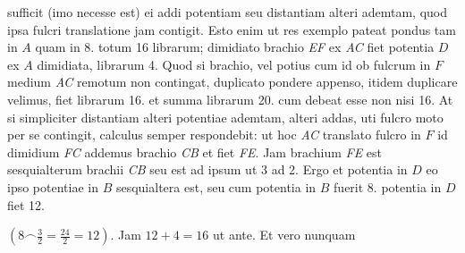 sufficit (imo necesse est) ei addi potentiam\protect{} seu distantiam alteri ademtam,
quod ipsa fulcr\protect{}i translatione jam contigit.
Esto enim ut res exemplo pateat pondus\protect{}
tam in $A$ quam in
8. totum 16 librarum;
dimidiato brachio\protect{} \textit{EF} ex \textit{AC} fiet
potentia\protect{} $D$ ex $A$ dimidiata, librarum 4. Quod si
brachio,\protect{} vel potius cum id ob fulcrum\protect{} in $F$ medium \textit{AC}
remotum non contingat, duplicato pondere\protect{}
appenso, itidem duplicare velimus, fiet librarum
16. et summa librarum 20. cum debeat esse
non nisi 16. At si simpliciter distantiam alteri
potentiae\protect{} ademtam, alteri addas, uti fulcro\protect{} moto
per se contingit, calculus semper respondebit: ut hoc
\textit{AC} translato fulcro\protect{} in $F$ id dimidium
\textit{FC} addemus brachio\protect{} \textit{CB} et
fiet \textit{FE}. Jam brachium\protect{} \textit{FE} est sesquialterum
brachii \textit{CB} seu est ad ipsum ut 3 ad 2.
Ergo et potentia\protect{} in $D$ eo ipso potentiae\protect{} in $B$
sesquialtera est, seu cum potentia\protect{} in $B$ fuerit
8. potentia in $D$ fiet 12.
\protect\rule[-4mm]{0mm}{10mm}$\displaystyle \left(8\smallfrown \frac{3}{2} = \frac{24}{2} =12 \right).$
Jam $\displaystyle 12 + 4 = 16$ ut ante. Et vero nunquam
